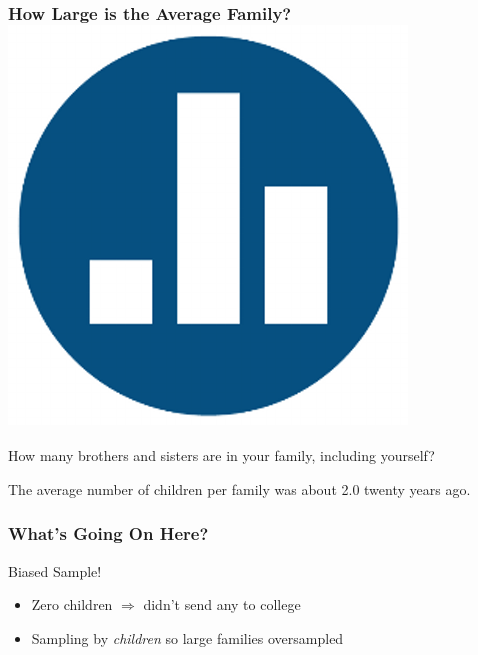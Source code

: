 \documentclass[handout]{beamer}
\begin{document}
\begin{frame}
\frametitle{How Large is the Average Family? \hfill\includegraphics[scale = 0.05]{./images/clicker}}

\Large How many brothers and sisters are in your family, including yourself?

\end{frame}

\begin{frame}
\Large
\alert{The average number of children per family was about 2.0 twenty years ago.}
\end{frame}
\begin{frame}
\frametitle{What's Going On Here?}
\pause
Biased Sample!
\begin{itemize}
 	\item  Zero children $\Rightarrow$ didn't send any to college
 	\item Sampling by \emph{children} so large families \alert{oversampled}
\end{itemize}


\end{frame}
\end{document}
